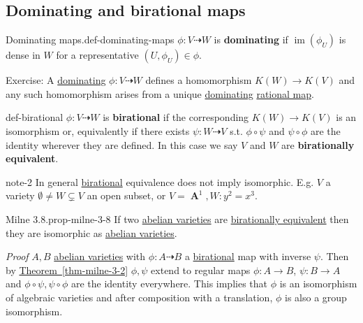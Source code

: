 \documentclass[10pt,]{book}
\makeatletter
\newcommand{\terminology}[1]{\textbf{#1}}
\renewcommand*{\proofname}{Proof}
\renewenvironment{proof}[1][\proofname]{\par
  \pushQED{\qed}%
  \normalfont \topsep6\p@\@plus6\p@\relax
  \trivlist
  \item\relax
    {\itshape
    #1\@addpunct{.}}\hspace\labelsep\ignorespaces
}{%
  \popQED\endtrivlist\@endpefalse
}
\numberwithin{equation}{section}
\DeclareMathOperator{\im}{im}
\DeclareMathOperator{\aff}{\mathbf{A}}
\makeatother
\begin{document}
\subsection[{Dominating and birational maps}]{Dominating and birational maps}\label{subsection-9}
\begin{definition}{Dominating maps.}{def-dominating-maps}%
\hypertarget{p-96}{}%
\(\phi\colon V \dashrightarrow W\) is \terminology{dominating} if \(\im (\phi_U)\) is dense in \(W\) for a representative \((U,\phi_U)\in \phi\).%
\end{definition}
\hypertarget{p-97}{}%
Exercise: A \hyperref[def-dominating-maps]{dominating} \(\phi\colon V\dashrightarrow W\) defines a homomorphism \(K(W) \to K(V)\) and any such homomorphism arises from a unique \hyperref[def-dominating-maps]{dominating} \hyperref[def-rational-map]{rational map}.%
\begin{definition}{}{def-birational}%
\hypertarget{p-98}{}%
\(\phi\colon V \dashrightarrow W\) is \terminology{birational} if the corresponding \(K(W)\to K(V)\) is an isomorphism or, equivalently if there exists \(\psi\colon W\dashrightarrow V \) s.t. \(\phi\circ \psi\) and \(\psi\circ\phi\) are the identity wherever they are defined. In this case we say \(V\) and \(W\) are \terminology{birationally equivalent}.%
\end{definition}
\begin{note}{}{note-2}%
\hypertarget{p-99}{}%
In general \hyperref[def-birational]{birational} equivalence does not imply isomorphic. E.g. \(V\) a variety \(\emptyset \ne W\subsetneq V\) an open subset, or \(V= \aff^1, W \colon y^2 =x^3\).%
\end{note}
\begin{theorem}{Milne 3.8.}{}{prop-milne-3-8}%
\hypertarget{p-100}{}%
If two \hyperref[def-buntes-abvar]{abelian varieties} are \hyperref[def-birational]{birationally equivalent} then they are isomorphic as \hyperref[def-buntes-abvar]{abelian varieties}.%
\end{theorem}
\begin{proof}\hypertarget{proof-16}{}
\hypertarget{p-101}{}%
\(A,B\) \hyperref[def-buntes-abvar]{abelian varieties} with \(\phi \colon A\dashrightarrow B\) a \hyperref[def-birational]{birational} map with inverse \(\psi\). Then by \hyperref[thm-milne-3-2]{Theorem~\ref{thm-milne-3-2}} \(\phi ,\psi\) extend to regular maps   \(\phi\colon A \to B \), \(\psi\colon B\to A\) and \(\phi\circ\psi,\psi\circ\phi\) are  the identity everywhere. This implies that \(\phi\) is an isomorphism of  algebraic varieties and after composition with a translation, \(\phi\) is also a group isomorphism.%
\end{proof}
\end{document}
